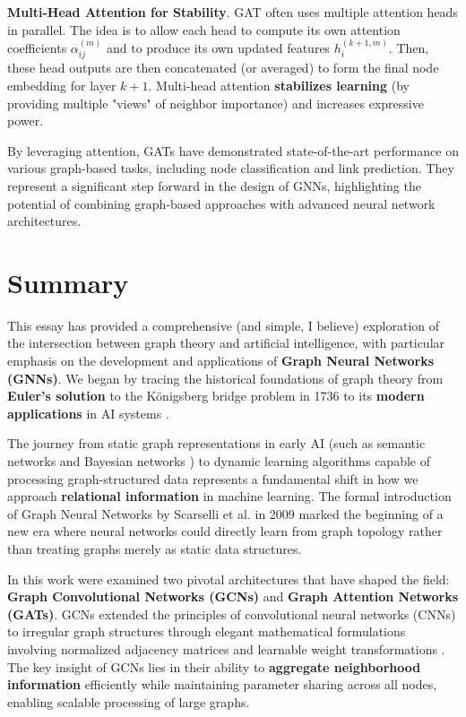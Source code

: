 \documentclass{article}
\begin{document}
\textbf{Multi-Head Attention for Stability}. GAT often uses multiple attention heads in parallel.
The idea is to allow each head to compute its own attention coefficients $\alpha_{ij}^{(m)}$ and to produce its own updated features $h_i^{(k+1,m)}$.
Then, these head outputs are then concatenated (or averaged) to form the final node embedding for layer $k + 1$.
Multi-head attention \textbf{stabilizes learning} (by providing multiple "views" of neighbor importance) and increases expressive power.

By leveraging attention, GATs have demonstrated state-of-the-art performance on various graph-based tasks, including node classification and link prediction.
They represent a significant step forward in the design of GNNs, highlighting the potential of combining graph-based approaches with advanced neural network architectures.

\section{Summary}

This essay has provided a comprehensive (and simple, I believe) exploration of the intersection between graph theory and artificial intelligence, with particular emphasis on the development and applications of \textbf{Graph Neural Networks (GNNs)}.
We began by tracing the historical foundations of graph theory from \textbf{Euler's solution} to the Königsberg bridge problem in 1736 \cite{carlson2019konigsberg} to its \textbf{modern applications} in AI systems \cite{fan2024graphmachinelearningera}.

The journey from static graph representations in early AI (such as semantic networks and Bayesian networks \cite{pearl1995bayesian, kelemen2007neural}) to dynamic learning algorithms capable of processing graph-structured data represents a fundamental shift in how we approach \textbf{relational information} in machine learning.
The formal introduction of Graph Neural Networks by Scarselli et al. in 2009 \cite{scarselli2009graph} marked the beginning of a new era where neural networks could directly learn from graph topology rather than treating graphs merely as static data structures.

In this work were examined two pivotal architectures that have shaped the field: \textbf{Graph Convolutional Networks (GCNs)} and \textbf{Graph Attention Networks (GATs)}.
GCNs extended the principles of convolutional neural networks (CNNs) \cite{krizhevsky2012imagenet} to irregular graph structures through elegant mathematical formulations involving normalized adjacency matrices and learnable weight transformations \cite{kipf2017semigcn}.
The key insight of GCNs lies in their ability to \textbf{aggregate neighborhood information} efficiently while maintaining parameter sharing across all nodes, enabling scalable processing of large graphs.
\end{document}

